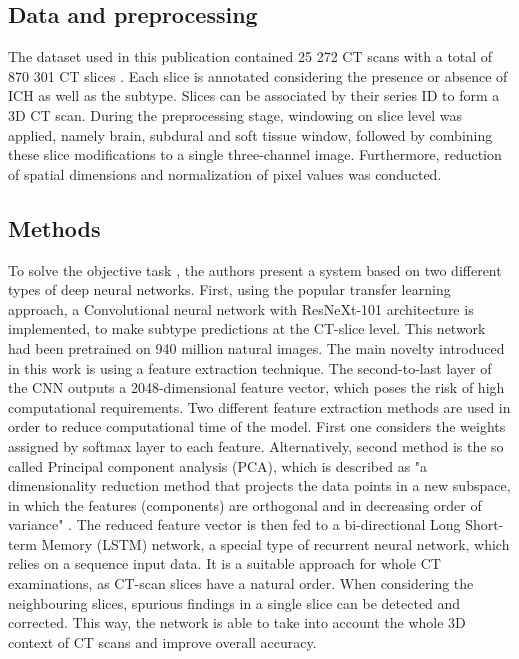 \subsection*{Data and preprocessing}
The dataset used in this publication contained 25 272 CT scans with a total of 870 301 CT slices \cite{RSNAchallenge}. Each slice is annotated considering the presence or absence of ICH as well as the subtype. Slices can be associated by their series ID to form a 3D CT scan. During the preprocessing stage, windowing on slice level was applied, namely brain, subdural and soft tissue window, followed by combining these slice modifications to a single three-channel image. Furthermore, reduction of spatial dimensions and normalization of pixel values was conducted.
\subsection*{Methods}
To solve the objective task \cite{relatedWork3}, the authors present a system based on two different types of deep neural networks. First, using the popular transfer learning approach, a Convolutional neural network with ResNeXt-101 architecture is implemented, to make subtype predictions at the CT-slice level. This network had been pretrained on 940 million natural images. The main novelty introduced in this work is using a feature extraction technique. The second-to-last layer of the CNN outputs a 2048-dimensional feature vector, which poses the risk of high computational requirements. Two different feature extraction methods are used in order to reduce computational time of the model. First one considers the weights assigned by softmax layer to each feature. Alternatively, second method is the so called Principal component analysis (PCA), which is described as "a dimensionality reduction method that projects the data points in a new subspace, in which the features (components) are orthogonal and in decreasing order of variance" \cite{relatedWork3}. The reduced feature vector is then fed to a bi-directional Long Short-term Memory (LSTM) network, a special type of recurrent neural network, which relies on a sequence input data. It is a suitable approach for whole CT examinations, as CT-scan slices have a natural order. When considering the neighbouring slices, spurious findings in a single slice can be detected and corrected. This way, the network is able to take into account the whole 3D context of CT scans and improve overall accuracy.
